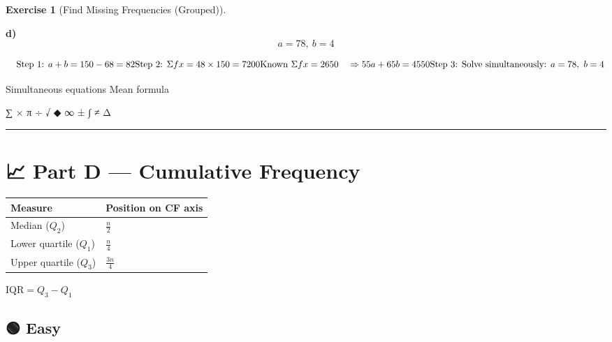 \documentclass[
  letterpaper,
  DIV=11,
  numbers=noendperiod]{scrreprt}
\theoremstyle{definition}
\newtheorem{exercise}{Exercise}[chapter]
\theoremstyle{remark}
\begin{document}
\begin{exercise}[Find Missing Frequencies
(Grouped)]
\begin{tcolorbox}
\textbf{d)} \[a = 78,\ b = 4\]

\[\quad \text{Step 1: }a+b=150-68=82\\[4pt]\text{Step 2: }\Sigma fx=48\times150=7200\\[4pt]\text{Known }\Sigma fx=2650\quad\Rightarrow 55a+65b=4550\\[4pt]\text{Step 3: Solve simultaneously: }a=78,\ b=4\]

\end{tcolorbox}

{Simultaneous equations} {Mean formula}

\end{exercise}

∑ × π ÷ √ ◆ ∞ ± ∫ ≠ Δ

\begin{center}\rule{0.5\linewidth}{0.5pt}\end{center}

\section{📈 Part D --- Cumulative Frequency}\label{sec-cumfreq}

\begin{tcolorbox}[enhanced jigsaw, opacitybacktitle=0.6, coltitle=black, arc=.35mm, colframe=quarto-callout-note-color-frame, colback=white, bottomrule=.15mm, left=2mm, colbacktitle=quarto-callout-note-color!10!white, titlerule=0mm, opacityback=0, title={🔑 Key Points}, leftrule=.75mm, breakable, rightrule=.15mm, bottomtitle=1mm, toptitle=1mm, toprule=.15mm]

\begin{longtable}[]{@{}ll@{}}
\toprule\noalign{}
Measure & Position on CF axis \\
\midrule\noalign{}
\endhead
\bottomrule\noalign{}
\endlastfoot
Median (\(Q_2\)) & \(\frac{n}{2}\) \\
Lower quartile (\(Q_1\)) & \(\frac{n}{4}\) \\
Upper quartile (\(Q_3\)) & \(\frac{3n}{4}\) \\
\end{longtable}

\(\text{IQR} = Q_3 - Q_1\)

\end{tcolorbox}

\subsection{🟢 Easy}
\end{document}
